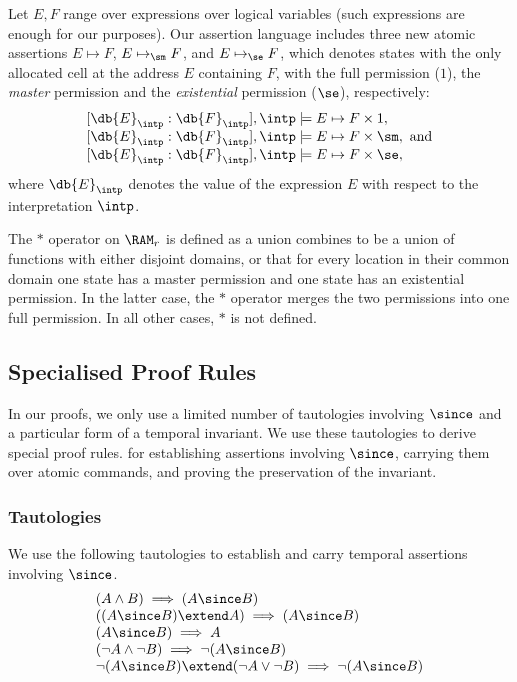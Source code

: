Let $E, F$ range over expressions over logical
variables (such expressions are enough for our purposes).
Our  assertion language includes three new atomic assertions
$E \mapsto F$, $E \mapsto_{\sm} F$, and $E \mapsto_{\se} F$, 
which denotes states with the only
allocated cell at the address $E$ containing $F$, with the full permission ($1$),
the \emph{master} permission and the \emph{existential} permission ($\se$), respectively:
$$
\begin{array}{l}
[\db{E}_{\intp} : \db{F}_{\intp}],\intp \models E \mapsto F \times 1,\\
{[}\db{E}_{\intp} : \db{F}_{\intp}],\intp \models E \mapsto F \times \sm, ~\text{and}\\
{[}\db{E}_{\intp} : \db{F}_{\intp}],\intp \models E \mapsto F \times \se,
\end{array}
$$
where $\db{E}_{\intp}$ denotes the value of the expression $E$ with respect to
the interpretation $\intp$.

The $*$ operator on $\RAM_r$ is defined as a union combines to be  a union of functions with 
either disjoint domains, or that for every location in their common domain one state 
has a master permission and one state has an existential permission.
In the latter case, the $*$ operator merges the two permissions into one full permission.
In all other cases, $*$ is not defined.





\subsection{Specialised Proof Rules}
In our proofs, we only use a limited number of tautologies involving $\since$ and a particular form of 
a temporal invariant. We use these tautologies to derive special proof rules.
for establishing assertions involving $\since$, carrying them over atomic commands, and proving the preservation 
of the invariant.


\subsubsection{Tautologies}
We use the following tautologies to establish and carry temporal assertions involving $\since$.
\[
\begin{array}{l}
(A \wedge B) \implies (A \since B) \\
((A \since B) \extend A) \implies (A \since B) \\
(A \since B) \implies A\\
(\neg A \wedge \neg B) \implies \neg (A \since B)\\
\neg (A \since B) \extend (\neg A \lor \neg B) \implies \neg (A \since B)
\end{array}
\]


